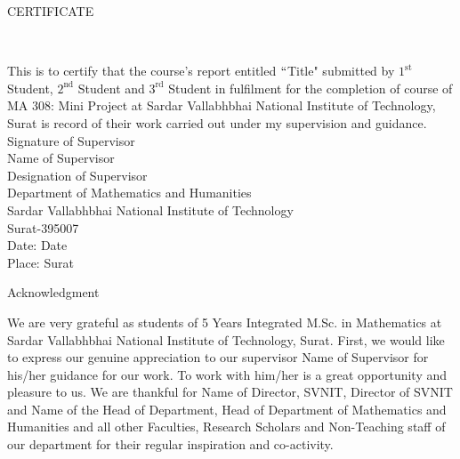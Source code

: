 \documentclass[11pt,a4paper]{report}
\begin{document}
\vspace{3\baselineskip}
\begin{center}
{\color{blue} \begin{large}
CERTIFICATE
\end{large}} \\[3\baselineskip]
\end{center}

This is to certify that the course's report entitled $``${\color{red}Title}" submitted by {\color{red} $1^{\text{st}}$ Student}, {\color{red} $2^{\text{nd}}$ Student} and {\color{red} $3^{\text{rd}}$ Student} in fulfilment for the completion of course of MA 308: Mini Project at Sardar Vallabhbhai National Institute of Technology, Surat is record of their work carried out under my supervision and guidance. \\[9\baselineskip]




{\color{red} Signature of Supervisor} \\
{\color{red} Name of Supervisor} \\
{\color{red} Designation of Supervisor} \\
Department of Mathematics and Humanities \\
Sardar Vallabhbhai National Institute of Technology \\
Surat-395007 \\[3\baselineskip]

Date: {\color{red} Date} \\
Place: Surat
																				
\newpage

\vspace*{3\baselineskip}
\begin{center}
\begin{LARGE}
{\color{blue} Acknowledgment} \\[3\baselineskip]
\end{LARGE}
\end{center}

We are very grateful as students of 5 Years Integrated M.Sc. in Mathematics at Sardar Vallabhbhai National Institute of Technology, Surat. First, we would like to express our genuine appreciation to our supervisor {\color{red} Name of Supervisor} for {\color{red} his/her} guidance for our work. To work with {\color{red} him/her} is a great opportunity and pleasure to us. We are thankful for {\color{red} Name of Director, SVNIT}, Director of SVNIT and {\color{red} Name of the Head of Department}, Head of Department of Mathematics and Humanities and all other Faculties, Research Scholars and Non-Teaching staff of our department for their regular inspiration and co-activity. \\[1\baselineskip]
\end{document}
